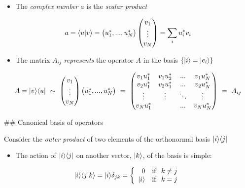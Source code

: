 \documentclass[11pt]{article}
\providecommand{\tightlist}{%
      \setlength{\itemsep}{0pt}\setlength{\parskip}{0pt}}
\begin{document}
\begin{itemize}
\tightlist
\item
  The \emph{complex number} \(a\) is the \emph{scalar product}
\end{itemize}

\[
a = \langle u|v\rangle = \begin{pmatrix} u_1^*, ..., u_N^* \end{pmatrix}
\begin{pmatrix} v_1 \\ \vdots \\ v_N \end{pmatrix} = \sum_i u_i^* v_i
\]

    \begin{itemize}
\tightlist
\item
  The matrix \(A_{ij}\) \emph{represents} the operator \(A\) in the
  basis \(\{|i\rangle = |e_i\rangle\}\)
\end{itemize}

\[
A = | v\rangle \langle u| ~\sim ~\begin{pmatrix} v_1 \\ \vdots \\ v_N\end{pmatrix}
\begin{pmatrix} u_1^*,...,u_N^*\end{pmatrix} ~=~ 
\begin{pmatrix} v_1 u_1^* & v_1u_2^* & ... & v_1 u_N^* \\
v_2 u_1^* & v_2 u_1^*& ... & v_2 u_N^* \\ \vdots & \vdots  & \ddots & \vdots \\
v_N u_1^* & & ... & v_N u_N^* \end{pmatrix} ~ = ~A_{ij}
\]

    \#\# Canonical basis of operators

Consider the \emph{outer product} of two elements of the orthonormal
basis \(| i\rangle \langle j|\)

\begin{itemize}
\tightlist
\item
  The action of \(| i\rangle \langle j|\) on another vector, \(|k\rangle\), of the
  basis is simple:
\end{itemize}

\[
 |i\rangle\langle j|k\rangle = |i\rangle \delta_{jk} = \left\{ \begin{array}{rl}
0 & {\rm if} ~~ k \neq j \\ |i\rangle & {\rm if} ~~ k = j \end{array} \right.
\]
\end{document}
